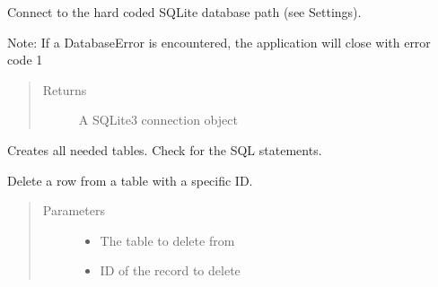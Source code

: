 \documentclass[letterpaper,10pt,english]{sphinxmanual}
\begin{document}
\begin{fulllineitems}
\begin{fulllineitems}
\begin{quote}
\begin{description}
\end{description}\end{quote}

\end{fulllineitems}


\begin{fulllineitems}
\label{\detokenize{src:src.Database.Database.connect}}
Connect to the hard coded SQLite database path (see Settings).

Note: If a DatabaseError is encountered, the application will close with error code 1
\begin{quote}\begin{description}
\item[{Returns}] \leavevmode
A SQLite3 connection object

\end{description}\end{quote}

\end{fulllineitems}


\begin{fulllineitems}
\label{\detokenize{src:src.Database.Database.createTables}}
Creates all needed tables.
Check {\hyperref[\detokenize{src:src.Database.DatabaseStatements}]{}} for the SQL statements.

\end{fulllineitems}


\begin{fulllineitems}
\label{\detokenize{src:src.Database.Database.deleteFromTableByID}}
Delete a row from a table with a specific ID.
\begin{quote}\begin{description}
\item[{Parameters}] \leavevmode\begin{itemize}
\item {} 
 \textendash{} The table to delete from

\item {} 
 \textendash{} ID of the record to delete


\end{itemize}
\end{description}
\end{quote}
\end{fulllineitems}
\end{fulllineitems}
\end{document}
